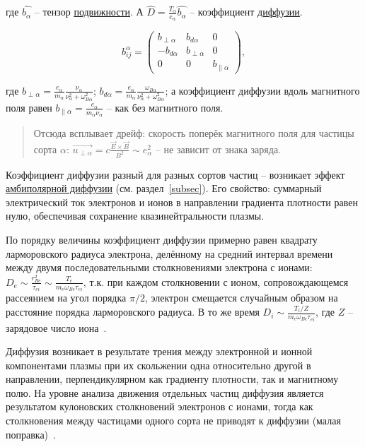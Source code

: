 \documentclass[10pt, a4paper]{article}
\begin{document}
где $\widehat{b_\alpha}$ -- тензор \uline{подвижности}. А $\widehat{D} = \frac{T_\alpha}{e_\alpha}\widehat{b_\alpha}$ -- коэффициент \uline{диффузии}.

\begin{equation*}
	b^\alpha_{ij} = 
	\begin{pmatrix}
		b_{\perp\alpha} & b_{d\alpha} & 0 \\
		-b_{d\alpha} & b_{\perp\alpha} & 0 \\
		0 & 0 & b_{\parallel\alpha}
	\end{pmatrix},
\end{equation*}

где $b_{\perp\alpha} = \frac{e_\alpha}{m_\alpha}\frac{\nu_\alpha}{\nu_\alpha^2+\omega_{B\alpha}^2}$; $b_{d\alpha} = \frac{e_\alpha}{m_\alpha}\frac{\omega_{B\alpha}}{\nu_\alpha^2+\omega_{B\alpha}^2}$; а коэффициент диффузии вдоль магнитного поля равен $b_{\parallel\alpha} = \frac{e_\alpha}{m_\alpha\nu_\alpha}$ -- как без магнитного поля.

\begin{quotation}
	Отсюда всплывает дрейф: скорость поперёк магнитного поля для частицы сорта $\alpha$: $\overrightarrow{u_{\perp\alpha}} = c\frac{\vec{E}\times\vec{B}}{B^2}\sim e_\alpha^2$ -- не зависит от знака заряда.
\end{quotation}

Коэффициент диффузии разный для разных сортов частиц -- возникает эффект \uline{амбиполярной диффузии} (см. раздел~\ref{subsec}). Его свойство: суммарный электрический ток электронов и ионов в направлении градиента плотности 
равен нулю, обеспечивая сохранение квазинейтральности плазмы.

По порядку величины коэффициент диффузии примерно равен квадрату ларморовского радиуса электрона, делённому на средний интервал времени между двумя последовательными столкновениями электрона с ионами: $D_e\sim\frac{r_{Be}^2}{\tau_{ei}}\sim\frac{T_e}{m_e\omega_{Be}\tau_{ei}}$, т.к. при каждом столкновении с ионом, сопровождающемся рассеянием на угол порядка $\pi/2$, электрон смещается случайным образом на расстояние порядка ларморовского радиуса. В то же время $D_i\sim\frac{T_i/Z}{m_e\omega_{Be}\tau_{ei}}$, где $Z$ -- зарядовое число иона~\cite{kotelnikov}.

Диффузия возникает в результате трения между электронной и ионной компонентами плазмы при их скольжении одна относительно другой в направлении, перпендикулярном как градиенту плотности, так и магнитному полю. На уровне анализа движения отдельных частиц диффузия является результатом кулоновских столкновений электронов с ионами, тогда 	как столкновения между частицами одного сорта не приводят к диффузии (малая поправка)~\cite{kotelnikov}.
\end{document}
